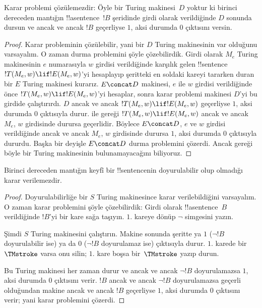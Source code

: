 \documentclass[../../../include/open-logic-section]{subfiles}
\begin{document}

\begin{thm}
Karar problemi çözülemezdir: Öyle bir Turing makinesi~$D$ yoktur ki birinci
dereceden mantığın !!a{sentence}~$!B$ şeridinde girdi olarak verildiğinde
$D$ sonunda dursun ve ancak ve ancak $!B$ geçerliyse $1$, aksi durumda $0$
çıktısını versin.
\end{thm}

\begin{proof}
Karar probleminin çözülebilir, yani bir $D$ Turing makinesinin var olduğunu
varsayalım. O zaman durma problemini şöyle çözebilirdik. Girdi olarak $M_e$
Turing makinesinin $e$ numarasıyla $w$ girdisi verildiğinde karşılık gelen
!!{sentence}~$!T(M_e,w)\lif !E(M_e,w)$'yi hesaplayıp şeritteki en soldaki
kareyi tararken duran bir $E$ Turing makinesi kurarız. $E\concat D$ makinesi,
$e$ ile $w$ girdisi verildiğinde önce $!T(M_e,w)\lif !E(M_e,w)$'yi hesaplar,
sonra karar problemi makinesi $D$'yi bu girdide çalıştırırdı. $D$ ancak ve
ancak $!T(M_e,w)\lif !E(M_e,w)$ geçerliyse $1$, aksi durumda $0$ çıktısıyla
durur.  ile
 gereği $!T(M_e,w)\lif !E(M_e,w)$ ancak ve
ancak $M_e$, $w$ girdisinde durursa geçerlidir. Böylece $E\concat D$, $e$ ve
$w$ girdisi verildiğinde ancak ve ancak $M_e$, $w$ girdisinde durursa $1$,
aksi durumda $0$ çıktısıyla dururdu. Başka bir deyişle $E\concat D$ durma
problemini çözerdi. Ancak  gereği böyle bir
Turing makinesinin bulunamayacağını biliyoruz.
\end{proof}

\begin{cor}%
Birinci dereceden mantığın keyfî bir !!{sentence}{}nin doyurulabilir olup
olmadığı karar verilemezdir.
\end{cor}

\begin{proof}
  Doyurulabilirliğe bir $S$ Turing makinesince karar verilebildiğini
  varsayalım. O zaman karar problemini şöyle çözebilirdik: Girdi olarak
  !!a{sentence}~$B$ verildiğinde $!B$'yi bir kare sağa taşıyın. $1$. kareye
  dönüp $\lnot$ simgesini yazın.

  Şimdi $S$ Turing makinesini çalıştırın. Makine sonunda şeritte ya $1$
  ($\lnot !B$ doyurulabilir ise) ya da $0$ ($\lnot !B$ doyurulamaz ise)
  çıktısıyla durur. $1$. karede bir~$\TMstroke$ varsa onu silin; $1$. kare
  boşsa bir~$\TMstroke$ yazıp durun.

  Bu Turing makinesi her zaman durur ve ancak ve ancak $\lnot !B$
  doyurulamazsa $1$, aksi durumda $0$ çıktısını verir. $!B$ ancak ve ancak
  $\lnot !B$ doyurulamazsa geçerli olduğundan makine ancak ve ancak $!B$
  geçerliyse $1$, aksi durumda $0$ çıktısını verir; yani karar problemini
  çözerdi.
\end{proof}
\end{document}
